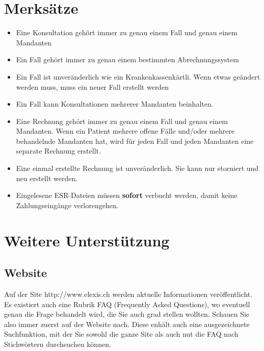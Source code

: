 \documentclass[a4paper]{scrartcl}
\begin{document}
\section{Merksätze}
\begin{itemize}
\item Eine Konsultation gehört immer zu genau einem Fall und genau einem Mandanten
\item Ein Fall gehört immer zu genau einem bestimmten Abrechnungssystem
\item Ein Fall ist unveränderlich wie ein Krankenkassenkärtli. Wenn etwas geändert werden muss, muss ein neuer Fall erstellt werden
\item Ein Fall kann Konsultationen mehrerer Mandanten beinhalten.
\item Eine Rechnung gehört immer zu genau einem Fall und genau einem Mandanten. Wenn ein Patient mehrere offene Fälle und/oder mehrere behandelnde Mandanten hat, wird für jeden Fall und jeden Mandanten eine separate Rechnung erstellt.
\item Eine einmal erstellte Rechnung ist unveränderlich. Sie kann nur storniert und neu erstellt werden.
\item Eingelesene ESR-Dateien müssen \textbf{sofort} verbucht werden, damit keine Zahlungseingänge verlorengehen.
\end{itemize}

\section{Weitere Unterstützung}
\subsection{Website}
Auf der Site http://www.elexis.ch werden aktuelle Informationen veröffentlicht. Es existiert auch eine Rubrik FAQ (Frequently Asked Questions), wo eventuell genau die Frage behandelt wird, die Sie auch grad stellen wollten. Schauen Sie also immer zuerst auf der Website nach. Diese enhält auch eine ausgezeichnete Suchfunktion, mit der Sie sowohl die ganze Site als auch nut die FAQ nach Stichwörtern durchsuchen können.
\end{document}

